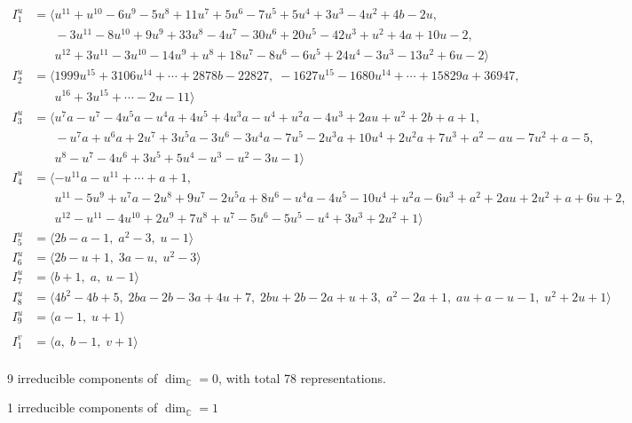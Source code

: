 \documentclass[1p]{elsarticle_modified}
\theoremstyle{definition}
\begin{document}
\begin{align*}
I^u_{1}&=\langle 
u^{11}+u^{10}-6 u^9-5 u^8+11 u^7+5 u^6-7 u^5+5 u^4+3 u^3-4 u^2+4 b-2 u,\\
\phantom{I^u_{1}}&\phantom{= \langle  }-3 u^{11}-8 u^{10}+9 u^9+33 u^8-4 u^7-30 u^6+20 u^5-42 u^3+u^2+4 a+10 u-2,\\
\phantom{I^u_{1}}&\phantom{= \langle  }u^{12}+3 u^{11}-3 u^{10}-14 u^9+u^8+18 u^7-8 u^6-6 u^5+24 u^4-3 u^3-13 u^2+6 u-2\rangle \\
I^u_{2}&=\langle 
1999 u^{15}+3106 u^{14}+\cdots+2878 b-22827,\;-1627 u^{15}-1680 u^{14}+\cdots+15829 a+36947,\\
\phantom{I^u_{2}}&\phantom{= \langle  }u^{16}+3 u^{15}+\cdots-2 u-11\rangle \\
I^u_{3}&=\langle 
u^7 a- u^7-4 u^5 a- u^4 a+4 u^5+4 u^3 a- u^4+u^2 a-4 u^3+2 a u+u^2+2 b+a+1,\\
\phantom{I^u_{3}}&\phantom{= \langle  }- u^7 a+u^6 a+2 u^7+3 u^5 a-3 u^6-3 u^4 a-7 u^5-2 u^3 a+10 u^4+2 u^2 a+7 u^3+a^2- a u-7 u^2+a-5,\\
\phantom{I^u_{3}}&\phantom{= \langle  }u^8- u^7-4 u^6+3 u^5+5 u^4- u^3- u^2-3 u-1\rangle \\
I^u_{4}&=\langle 
- u^{11} a- u^{11}+\cdots+a+1,\\
\phantom{I^u_{4}}&\phantom{= \langle  }u^{11}-5 u^9+u^7 a-2 u^8+9 u^7-2 u^5 a+8 u^6- u^4 a-4 u^5-10 u^4+u^2 a-6 u^3+a^2+2 a u+2 u^2+a+6 u+2,\\
\phantom{I^u_{4}}&\phantom{= \langle  }u^{12}- u^{11}-4 u^{10}+2 u^9+7 u^8+u^7-5 u^6-5 u^5- u^4+3 u^3+2 u^2+1\rangle \\
I^u_{5}&=\langle 
2 b- a-1,\;a^2-3,\;u-1\rangle \\
I^u_{6}&=\langle 
2 b- u+1,\;3 a- u,\;u^2-3\rangle \\
I^u_{7}&=\langle 
b+1,\;a,\;u-1\rangle \\
I^u_{8}&=\langle 
4 b^2-4 b+5,\;2 b a-2 b-3 a+4 u+7,\;2 b u+2 b-2 a+u+3,\;a^2-2 a+1,\;a u+a- u-1,\;u^2+2 u+1\rangle \\
I^u_{9}&=\langle 
a-1,\;u+1\rangle \\
\\
I^v_{1}&=\langle 
a,\;b-1,\;v+1\rangle \\
\end{align*}
\raggedright * 9 irreducible components of $\dim_{\mathbb{C}}=0$, with total 78 representations.\\
\raggedright * 1 irreducible components of $\dim_{\mathbb{C}}=1$ \\
\end{document}
